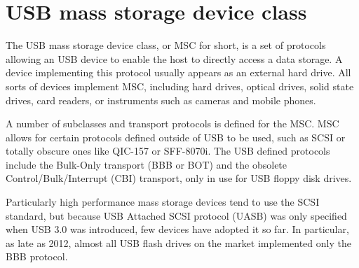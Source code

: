 
    \section{USB mass storage device class}
        The USB mass storage device class, or MSC for short, is a set of protocols allowing an USB device to enable the host to directly access a data storage.  A device implementing this protocol usually appears as an external hard drive.  All sorts of devices implement MSC, including hard drives, optical drives, solid state drives, card readers, or instruments such as cameras and mobile phones\cite{usb-keil-msc}.
        
        A number of subclasses and transport protocols is defined for the MSC.  MSC allows for certain protocols defined outside of USB to be used, such as SCSI or totally obscure ones like QIC-157 or SFF-8070i.  The USB defined protocols include the Bulk-Only transport (BBB or BOT) and the obsolete Control/Bulk/Interrupt (CBI) transport, only in use for USB floppy disk drives\cite{usb-mass-storage}\cite{usb-mass-bulk}.
        
        Particularly high performance mass storage devices tend to use the SCSI standard\cite{usb-electronicdesign-usb-uasp-bot}, but because USB Attached SCSI protocol (UASB) was only specified when USB 3.0 was introduced, few devices have adopted it so far\cite{usb-winaero-usb-scsi-uas}.  In particular, as late as 2012, almost all USB flash drives on the market implemented only the BBB protocol\cite{usb-qemu-usb-storage}.
        

